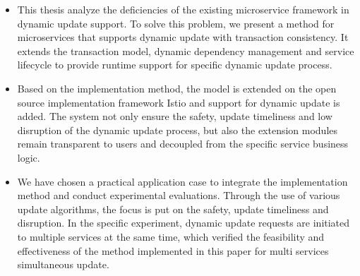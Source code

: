 \documentclass[macfonts,master]{njuthesis}
\begin{document}
\begin{englishabstract}
\begin{itemize}
  \item This thesis analyze the deficiencies of the existing microservice framework in dynamic update support. To solve this problem, we present a method for microservices that supports dynamic update with transaction consistency. It extends the transaction model, dynamic dependency management and service lifecycle to provide runtime support for specific dynamic update process.
  \item Based on the implementation method, the model is extended on the open source implementation framework Istio and support for dynamic update is added. The system not only ensure the safety, update timeliness and low disruption of the dynamic update process, but also the extension modules remain transparent to users and decoupled from the specific service business logic.
  \item We have chosen a practical application case to integrate the implementation method and conduct experimental evaluations. Through the use of various update algorithms, the focus is put on the safety, update timeliness and disruption. In the specific experiment, dynamic update requests are initiated to multiple services at the same time, which verified the feasibility and effectiveness of the method implemented in this paper for multi services simultaneous update.
\end{itemize}
\end{englishabstract}


\tableofcontents

\listoffigures

\listoftables

\mainmatter

\end{document}
